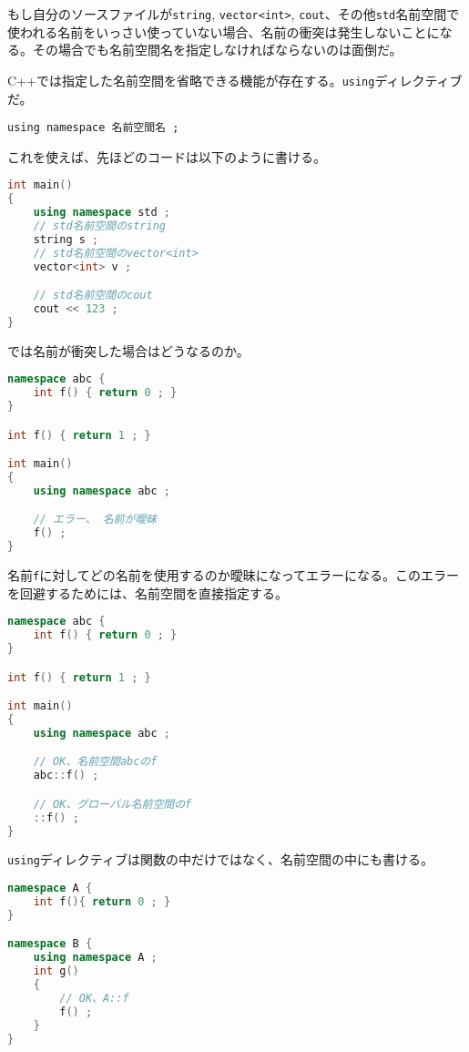もし自分のソースファイルが\texttt{string}, \texttt{vector<int>}, \texttt{cout}、その他\texttt{std}名前空間で使われる名前をいっさい使っていない場合、名前の衝突は発生しないことになる。その場合でも名前空間名を指定しなければならないのは面倒だ。

C++では指定した名前空間を省略できる機能が存在する。\texttt{using}ディレクティブだ。

\begin{lstlisting}[style=grammar]
using namespace 名前空間名 ;
\end{lstlisting}

\ifTombow\pagebreak\fi
これを使えば、先ほどのコードは以下のように書ける。

\begin{lstlisting}[language={C++}]
int main()
{
    using namespace std ;
    // std名前空間のstring
    string s ;
    // std名前空間のvector<int>
    vector<int> v ;

    // std名前空間のcout
    cout << 123 ;
}
\end{lstlisting}

では名前が衝突した場合はどうなるのか。

\begin{lstlisting}[language={C++}]
namespace abc {
    int f() { return 0 ; }
}

int f() { return 1 ; }

int main()
{
    using namespace abc ;

    // エラー、 名前が曖昧
    f() ;
}
\end{lstlisting}

名前\texttt{f}に対してどの名前を使用するのか曖昧になってエラーになる。このエラーを回避するためには、名前空間を直接指定する。

\begin{lstlisting}[language={C++}]
namespace abc {
    int f() { return 0 ; }
}

int f() { return 1 ; }

int main()
{
    using namespace abc ;

    // OK、名前空間abcのf
    abc::f() ;

    // OK、グローバル名前空間のf
    ::f() ;
}
\end{lstlisting}

\texttt{using}ディレクティブは関数の中だけではなく、名前空間の中にも書ける。

\begin{lstlisting}[language={C++}]
namespace A {
    int f(){ return 0 ; }
}

namespace B {
    using namespace A ;
    int g()
    {
        // OK、A::f
        f() ;
    }
}
\end{lstlisting}


